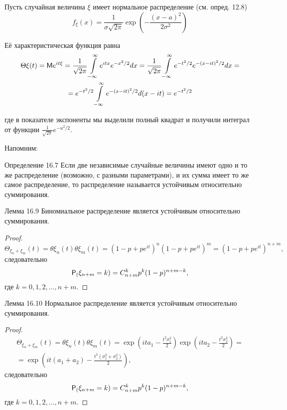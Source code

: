 \begin{example}
Пусть случайная величина $\xi$ имеет нормальное распределение  (см. опред. 12.8)
$$
f_\xi(x)=\frac{1}{\sigma\sqrt{2\pi}}
\exp\left(
	-\frac{(x-a)^2}{2\sigma^2}
\right)
$$

Её характеристическая функция равна
%
%
\begin{gather*}
\Theta\xi (t)=\M e^{it\xi}=
\frac{1}{\sqrt{2\pi}}
\int\limits_{-\infty}^\infty e^{itx}e^{-x^2/2} dx=
%
\frac{1}{\sqrt{2\pi}}
\int\limits_{-\infty}^\infty e^{-t^2/2}e^{-(x-it)^2/2} dx=\\=
e^{-t^2/2}\int\limits_{-\infty}^\infty e^{-(x-it)^2/2} d(x-it)=
e^{-t^2/2}
\end{gather*}

где в показателе экспоненты мы выделили полный квадрат и получили интеграл от функции $\frac{1}{\sqrt{2\pi}}e^{-u^2/2}$.
\end{example}

Напомним:
\begin{repdefinition}{Определение 16.7}
Если две независимые случайные величины имеют одно и то же распределение (возможно, с разными параметрами), и их сумма имеет то же самое распределение, то распределение называется устойчивым относительно суммирования.
\end{repdefinition}

\begin{replemma}{Лемма 16.9}
Биномиальное распределение является устойчивым относительно суммирования.
\end{replemma}
\begin{proof}
\begin{equation*}
	\Theta_{\xi_n +\xi_m}(t) = \theta\xi_n(t)\theta\xi_m(t) = (1-p+pe^{it})^n (1-p+pe^{it})^m=(1-p+pe^{it})^{n+m},
\end{equation*}
следовательно
\begin{equation*}
	\P_(\xi_{n+m} = k) = C_{n+m}^k p^k (1-p)^{n+m-k},
\end{equation*}
где $k = 0, 1, 2, \ldots , n+m$.
\end{proof}


\begin{replemma}{Лемма 16.10}
Нормальное распределение является устойчивым относительно суммирования.
\end{replemma}
\begin{proof}
\begin{gather*}
	\Theta_{\xi_n +\xi_m}(t) = \theta\xi_n(t)\theta\xi_m(t) =
	\exp\left(
		ita_1-\frac{t^2\sigma_1^2}{2}
	\right)
	\exp\left(
		ita_2-\frac{t^2\sigma_2^2}{2}
	\right)
	=\\=
	\exp\left(
		it(a_1+a_2)-\frac{t^2(\sigma_1^2+\sigma_2^2)}{2}
	\right),
\end{gather*}
следовательно
\begin{equation*}
	\P_(\xi_{n+m} = k) = C_{n+m}^k p^k (1-p)^{n+m-k},
\end{equation*}
где $k = 0, 1, 2, \ldots , n+m$.
\end{proof}